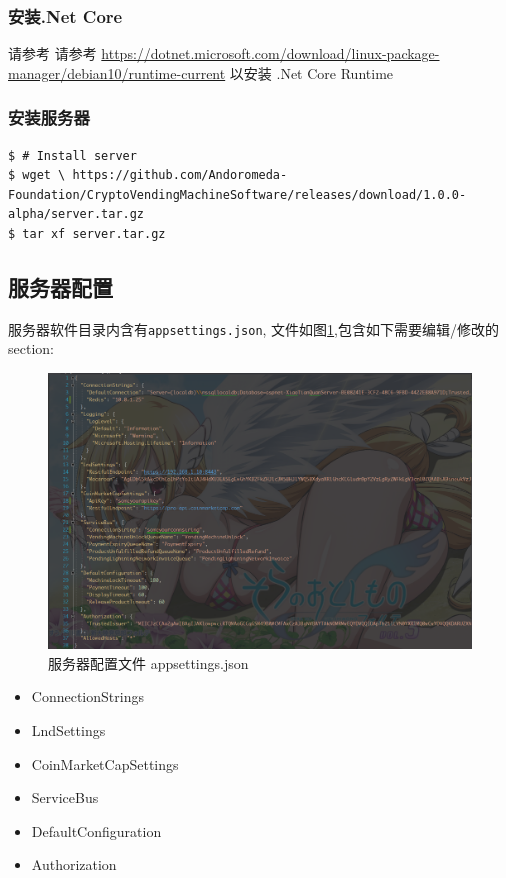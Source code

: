\documentclass[a4paper,11pt]{article}
\theoremstyle{definition}
\begin{document}
    \subsubsection{安装.Net Core}
    请参考 请参考 \url{https://dotnet.microsoft.com/download/linux-package-manager/debian10/runtime-current} 以安装 .Net Core Runtime
    
    \subsubsection{安装服务器}
    
        \begin{lstlisting}
$ # Install server
$ wget \ https://github.com/Andoromeda-Foundation/CryptoVendingMachineSoftware/releases/download/1.0.0-alpha/server.tar.gz
$ tar xf server.tar.gz
        \end{lstlisting}

\subsection{服务器配置}\label{sec:server-config}

服务器软件目录内含有\verb|appsettings.json|, 文件如图\ref{fig:appsettings},包含如下需要编辑/修改的section:

    \begin{figure}[htbp]
    \minipage[b][][b]{\textwidth}
        \includegraphics[width=\linewidth]{appsettings.png}
        \caption{服务器配置文件 appsettings.json}
        \label{fig:appsettings}
    \endminipage\hfill
    \end{figure}

\begin{itemize}
  \item ConnectionStrings
  \item LndSettings
  \item CoinMarketCapSettings
  \item ServiceBus
  \item DefaultConfiguration
  \item Authorization
\end{itemize}
\end{document}

